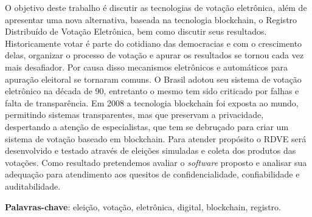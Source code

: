 \begin{resumo}
	\vspace{\onelineskip}
	\noindent
	O objetivo deste trabalho é discutir as tecnologias de votação eletrônica, além de apresentar uma nova alternativa, baseada na tecnologia blockchain, o Registro Distribuído de Votação Eletrônica, bem como discutir seus resultados. Historicamente votar é parte do cotidiano das democracias e com o crescimento delas, organizar o processo de votação e apurar os resultados se tornou cada vez mais desafiador. Por causa disso mecanismos eletrônicos e automáticos para apuração eleitoral se tornaram comuns. O Brasil adotou seu sistema de votação eletrônico na década de 90, entretanto o mesmo tem sido criticado por falhas e falta de transparência. Em 2008 a tecnologia blockchain foi exposta ao mundo, permitindo sistemas transparentes, mas que preservam a privacidade, despertando a atenção de especialistas, que tem se debruçado para criar um sistema de votação baseado em blockchain. 
	Para atender propósito o RDVE será desenvolvido e testado através de eleições simuladas e coleta dos produtos das votações. Como resultado pretendemos avaliar o \textit{software} proposto e analisar sua adequação para atendimento aos quesitos de confidencialidade, confiabilidade e auditabilidade.
	\par\textbf{Palavras-chave}: eleição, votação, eletrônica, digital, blockchain, registro. 
\end{resumo}


